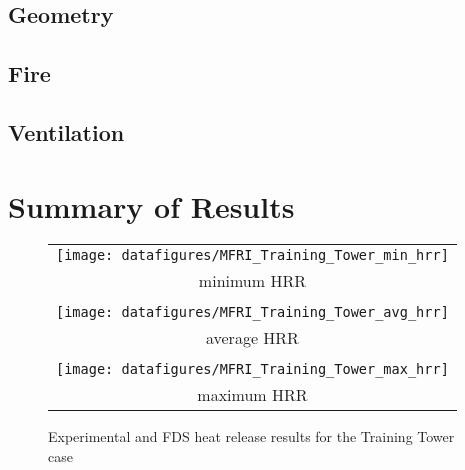 \documentclass[11pt]{book}
\begin{document}
\subsection{Geometry}

\subsection{Fire}

\subsection{Ventilation}

\section{Summary of Results}

\begin{figure}[\figoptions]
\begin{center}
\begin{tabular}{c}
 \texttt{[image: datafigures/MFRI\_Training\_Tower\_min\_hrr]}\\
 minimum HRR\\
 \\
 \texttt{[image: datafigures/MFRI\_Training\_Tower\_avg\_hrr]}\\
 average HRR\\
 \\
 \texttt{[image: datafigures/MFRI\_Training\_Tower\_max\_hrr]}\\
 maximum HRR\\
\end{tabular}
\end{center}
\caption {Experimental and FDS heat release results for the
Training Tower case}
\label{figtrainingtowerhrr}%
\end{figure}
\end{document}

